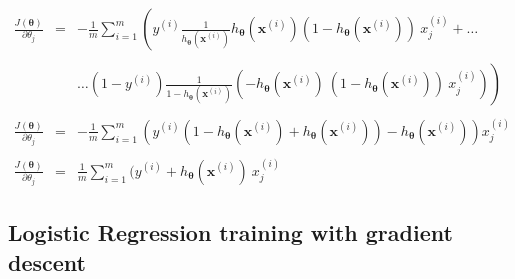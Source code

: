 \documentclass{article}
\begin{document}
$$\begin{array}{rccl}       
    \frac{J(\boldsymbol{\theta})}{\partial \theta_j} & = & -\frac{1}{m} \displaystyle \sum_{i=1}^{m}\left( y^{(i)} \frac{1}{h_{\boldsymbol{\theta}}(\boldsymbol{x}^{(i)})} h_{\boldsymbol{\theta}}(\boldsymbol{x}^{(i)}) \left(1 - h_{\boldsymbol{\theta}}(\boldsymbol{x}^{(i)})\right) \ x^{(i)}_j + \dots \right.  &  \\\\
    & & \left. \dots (1 - y^{(i)}) \frac{1}{1 - h_{\boldsymbol{\theta}}(\boldsymbol{x}^{(i)})} \left(-h_{\boldsymbol{\theta}}(\boldsymbol{x}^{(i)}) \ (1 - h_{\boldsymbol{\theta}}(\boldsymbol{x}^{(i)})) \ x^{(i)}_j\right) \right) \\\\
    \frac{J(\boldsymbol{\theta})}{\partial \theta_j} & = & -\frac{1}{m} \displaystyle \sum_{i=1}^{m}\left(y^{(i)} (1 - h_{\boldsymbol{\theta}}(\boldsymbol{x}^{(i)}) + h_{\boldsymbol{\theta}}(\boldsymbol{x}^{(i)})) - h_{\boldsymbol{\theta}}(\boldsymbol{x}^{(i)}) \right) x^{(i)}_j & \\\\
    \frac{J(\boldsymbol{\theta})}{\partial \theta_j} & = & \frac{1}{m} \displaystyle \sum_{i=1}^{m} (y^{(i)} + h_{\boldsymbol{\theta}}(\boldsymbol{x}^{(i)}) \ x^{(i)}_j
    
\end{array}$$

\newpage

\subsection{Logistic Regression training with gradient descent}
\end{document}
